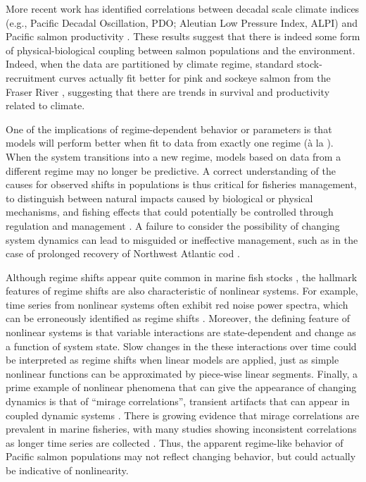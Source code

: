 More recent work has identified correlations between decadal scale climate indices (e.g., Pacific Decadal Oscillation, PDO; Aleutian Low Pressure Index, ALPI) and Pacific salmon productivity \cite{Mantua_1997, Beamish_1997}. These results suggest that there is indeed some form of physical-biological coupling between salmon populations and the environment. Indeed, when the data are partitioned by climate regime, standard stock-recruitment curves actually fit better for pink and sockeye salmon from the Fraser River \cite{Beamish_2004a}, suggesting that there are trends in survival and productivity related to climate.

One of the implications of regime-dependent behavior or parameters is that models will perform better when fit to data from exactly one regime (\`{a} la \cite{Beamish_2004a}). When the system transitions into a new regime, models based on data from a different regime may no longer be predictive. A correct understanding of the causes for observed shifts in populations is thus critical for fisheries management, to distinguish between natural impacts caused by biological or physical mechanisms, and fishing effects that could potentially be controlled through regulation and management \cite{Beamish_1999}. A failure to consider the possibility of changing system dynamics can lead to misguided or ineffective management, such as in the case of prolonged recovery of Northwest Atlantic cod \cite{Shelton_2011a}.

Although regime shifts appear quite common in marine fish stocks \cite{Vert-pre_2013}, the hallmark features of regime shifts are also characteristic of nonlinear systems. For example, time series from nonlinear systems often exhibit red noise power spectra, which can be erroneously identified as regime shifts \cite{Rudnick_2003}. Moreover, the defining feature of nonlinear systems is that variable interactions are state-dependent and change as a function of system state. Slow changes in the these interactions over time could be interpreted as regime shifts when linear models are applied, just as simple nonlinear functions can be approximated by piece-wise linear segments. Finally, a prime example of nonlinear phenomena that can give the appearance of changing dynamics is that of ``mirage correlations'', transient artifacts that can appear in coupled dynamic systems \cite{Sugihara_2012}. There is growing evidence that mirage correlations are prevalent in marine fisheries, with many studies showing inconsistent correlations as longer time series are collected \cite{Myers_1998, McClatchie_2010, Litzow_2014a}. Thus, the apparent regime-like behavior of Pacific salmon populations may not reflect changing behavior, but could actually be indicative of nonlinearity.

